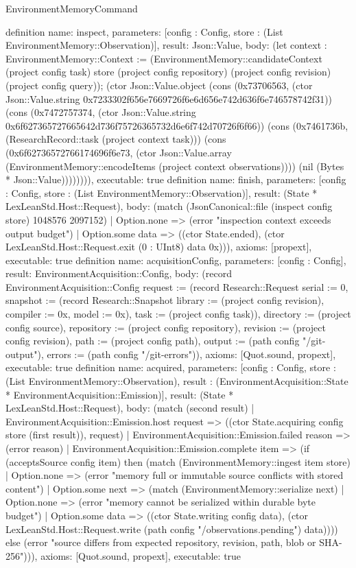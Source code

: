 \begin{lexlean}{EnvironmentMemoryCommand}
\begin{semanticmodule}
{}
definition{
 name: inspect, parameters: [config : Config, store : (List EnvironmentMemory::Observation)], result: Json::Value,
 body: (let context : EnvironmentMemory::Context := (EnvironmentMemory::candidateContext (project config task) store (project config repository) (project config revision) (project config query)); (ctor Json::Value.object (cons (0x73706563, (ctor Json::Value.string 0x7233302f656e7669726f6e6d656e742d636f6e746578742f31)) (cons (0x7472757374, (ctor Json::Value.string 0x6f627365727665642d736f75726365732d6e6f742d70726f6f66)) (cons (0x7461736b, (ResearchRecord::task (project context task))) (cons (0x6f62736572766174696f6e73, (ctor Json::Value.array (EnvironmentMemory::encodeItems (project context observations)))) (nil (Bytes * Json::Value)))))))), executable: true
}
definition{
 name: finish, parameters: [config : Config, store : (List EnvironmentMemory::Observation)], result: (State * LexLeanStd.Host::Request),
 body: (match (JsonCanonical::file (inspect config store) 1048576 2097152) | Option.none => (error "inspection context exceeds output budget") | Option.some data => ((ctor State.ended), (ctor LexLeanStd.Host::Request.exit (0 : UInt8) data 0x))), axioms: [propext], executable: true
}
definition{
 name: acquisitionConfig, parameters: [config : Config], result: EnvironmentAcquisition::Config,
 body: (record EnvironmentAcquisition::Config {request := (record Research::Request {serial := 0, snapshot := (record Research::Snapshot {library := (project config revision), compiler := 0x, model := 0x}), task := (project config task)}), directory := (project config source), repository := (project config repository), revision := (project config revision), path := (project config path), output := (path config "/git-output"), errors := (path config "/git-errors")}), axioms: [Quot.sound, propext], executable: true
}
definition{
 name: acquired, parameters: [config : Config, store : (List EnvironmentMemory::Observation), result : (EnvironmentAcquisition::State * EnvironmentAcquisition::Emission)], result: (State * LexLeanStd.Host::Request),
 body: (match (second result) | EnvironmentAcquisition::Emission.host request => ((ctor State.acquiring config store (first result)), request) | EnvironmentAcquisition::Emission.failed reason => (error reason) | EnvironmentAcquisition::Emission.complete item => (if (acceptsSource config item) then (match (EnvironmentMemory::ingest item store) | Option.none => (error "memory full or immutable source conflicts with stored content") | Option.some next => (match (EnvironmentMemory::serialize next) | Option.none => (error "memory cannot be serialized within durable byte budget") | Option.some data => ((ctor State.writing config data), (ctor LexLeanStd.Host::Request.write (path config "/observations.pending") data)))) else (error "source differs from expected repository, revision, path, blob or SHA-256"))), axioms: [Quot.sound, propext], executable: true
}
\end{semanticmodule}
\end{lexlean}
